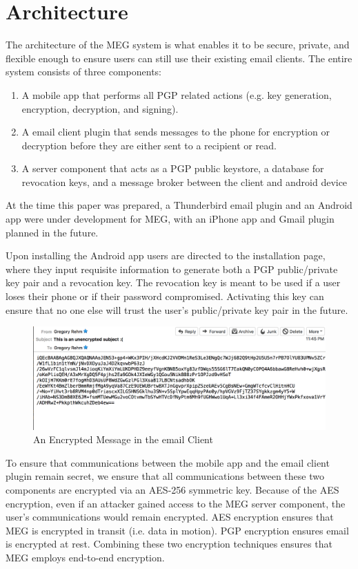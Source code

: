 \documentclass{sig-alternate-05-2015}
\begin{document}
\section{Architecture}
\par The architecture of the MEG system is what enables it to be secure, private, and flexible enough to ensure users can still use their existing email clients. The entire system consists of three components:
\begin{enumerate}
    \item A mobile app that performs all PGP related actions (e.g. key generation, encryption, decryption, and signing).
    \item A email client plugin that sends messages to the phone for encryption or decryption before they are either sent to a recipient or read.
    \item A server component that acts as a PGP public keystore, a database for revocation keys, and a message broker between the client and android device
\end{enumerate}
At the time this paper was prepared, a Thunderbird email plugin and an Android app were under development for MEG, with an iPhone app and Gmail plugin planned in the future.
\par Upon installing the Android app users are directed to the installation page, where they input requisite information to generate both a PGP public/private key pair and a revocation key. The revocation key is meant to be used if a user loses their phone or if their password compromised. Activating this key can ensure that no one else will trust the user's public/private key pair in the future.
\begin{figure}[H]
    \centering
    \includegraphics[scale=.42]{encrypted-msg.png}
    \caption{An Encrypted Message in the email Client}
    \label{fig:Encrypted-client}
\end{figure}
\par To ensure that communications between the mobile app and the email client plugin remain secret, we ensure that all communications between these two components are encrypted via an AES-256 symmetric key. Because of the AES encryption, even if an attacker gained access to the MEG server component, the user's communications would remain encrypted. AES encryption ensures that MEG is encrypted in transit (i.e. data in motion). PGP encryption ensures email is encrypted at rest. Combining these two encryption techniques ensures that MEG employs end-to-end encryption.
\end{document}
